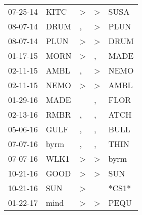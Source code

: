 \begin{supertabular}{p{0.07\textwidth}p{0.06\textwidth}p{0.02\textwidth}p{0.02\textwidth}p{0.06\textwidth}}
          07-25-14\textsuperscript{} &           KITC\textsuperscript{} &     \textgreater &     \textgreater &           SUSA\textsuperscript{} \\
          08-07-14\textsuperscript{} &           DRUM\textsuperscript{} &                , &     \textgreater &           PLUN\textsuperscript{} \\
          08-07-14\textsuperscript{} &           PLUN\textsuperscript{} &     \textgreater &     \textgreater &           DRUM\textsuperscript{} \\
          01-17-15\textsuperscript{} &           MORN\textsuperscript{} &     \textgreater &                , &           MADE\textsuperscript{} \\
          02-11-15\textsuperscript{} &           AMBL\textsuperscript{} &                , &     \textgreater &           NEMO\textsuperscript{} \\
          02-11-15\textsuperscript{} &           NEMO\textsuperscript{} &     \textgreater &     \textgreater &           AMBL\textsuperscript{} \\
          01-29-16\textsuperscript{} &           MADE\textsuperscript{} &                  &                , &           FLOR\textsuperscript{} \\
          02-13-16\textsuperscript{} &           RMBR\textsuperscript{} &                , &                , &           ATCH\textsuperscript{} \\
          05-06-16\textsuperscript{} &           GULF\textsuperscript{} &                , &                , &           BULL\textsuperscript{} \\
          07-07-16\textsuperscript{} &           byrm\textsuperscript{} &                , &                , &           THIN\textsuperscript{} \\
          07-07-16\textsuperscript{} &           WLK1\textsuperscript{} &     \textgreater &     \textgreater &           byrm\textsuperscript{} \\
          10-21-16\textsuperscript{} &           GOOD\textsuperscript{} &     \textgreater &     \textgreater &            SUN\textsuperscript{} \\
          10-21-16\textsuperscript{} &            SUN\textsuperscript{} &     \textgreater &                  &                            *CS1* \\
          01-22-17\textsuperscript{} &           mind\textsuperscript{} &     \textgreater &     \textgreater &           PEQU\textsuperscript{} \\

\end{supertabular}
